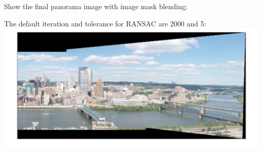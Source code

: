 \documentclass[12pt,letterpaper,boxed]{hmcpset}
\begin{document}
\begin{problem}[6.2]
Show the final panorama image with image mask blending:
\end{problem}

\begin{solution}
  The default iteration and tolerance for RANSAC are 2000 and 5:\\
  \includegraphics[width=\textwidth]{q6_2.jpg}\\
\end{solution}
\end{document}

